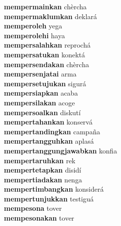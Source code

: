 \textbf{mempermainkan } chèrcha \\
\textbf{mempermaklumkan } deklará \\
\textbf{memperoleh } yega \\
\textbf{memperolehi } haya \\
\textbf{mempersalahkan } reprochá \\
\textbf{mempersatukan } konektá \\
\textbf{mempersendakan } chèrcha \\
\textbf{mempersenjatai } arma \\
\textbf{mempersetujukan } sigurá \\
\textbf{mempersiapkan } acaba \\
\textbf{mempersilakan } acoge \\
\textbf{mempersoalkan } diskutí \\
\textbf{mempertahankan } konservá \\
\textbf{mempertandingkan } campaña \\
\textbf{mempertangguhkan } aplasá \\
\textbf{mempertanggungjawabkan } konfia \\
\textbf{mempertaruhkan } rek \\
\textbf{mempertetapkan } disidí \\
\textbf{mempertiadakan } nenga \\
\textbf{mempertimbangkan } konsiderá \\
\textbf{mempertunjukkan } testiguá \\
\textbf{mempesona } tover \\
\textbf{mempesonakan } tover \\
